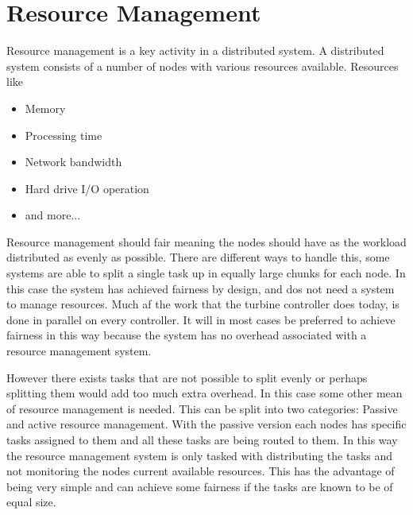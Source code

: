 \chapter{Resource Management} %

Resource management is a key activity in a distributed system.
A distributed system consists of a number of nodes with various resources available. 
Resources like 
\begin{itemize}
	\item Memory
	\item Processing time
	\item Network bandwidth
	\item Hard drive I/O operation
	\item and more...
\end{itemize}

Resource management should fair meaning the nodes should have as the workload distributed as evenly as possible.
There are different ways to handle this, some systems are able to split a single task up in equally large chunks for each node.
In this case the system has achieved fairness by design, and dos not need a system to manage resources.
Much af the work that the turbine controller does today, is done in parallel on every controller.
It will in most cases be preferred to achieve fairness in this way because the system has no overhead associated with a resource management system.

However there exists tasks that are not possible to split evenly or perhaps splitting them would add too much extra overhead.
In this case some other mean of resource management is needed.
This can be split into two categories: Passive and active resource management.
With the passive version each nodes has specific tasks assigned to them and all these tasks are being routed to them.
In this way the resource management system is only tasked with distributing the tasks and not monitoring the nodes current available resources.
This has the advantage of being very simple and can achieve some fairness if the tasks are known to be of equal size.

